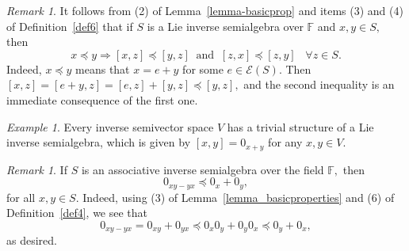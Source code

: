 \documentclass[10pt,a4paper]{amsart}
\theoremstyle{definition}
\theoremstyle{remark}
\newtheorem{rem}[thm]{Remark}
\newtheorem{ex}[thm]{Example}
\numberwithin{equation}{section}
\newtheorem*{Theorem A}{\textbf{Theorem A}}
\newtheorem*{Corollary E}{\textbf{Corollary E}}
\newtheorem*{Corollary F}{\textbf{Corollary F}}
\newtheorem*{Theorem B}{\textbf{Theorem B}}
\newtheorem*{Theorem C}{\textbf{Theorem C}}
\newtheorem*{Theorem D}{\textbf{Theorem B}}
\newtheorem*{p a}{\textbf{Proof of  Theorem A}}
\newtheorem*{p b}{\textbf{Proof of Theorem B}}
\newtheorem*{p c}{\textbf{Proof of  Theorem C}}
\newtheorem*{p d}{\textbf{Proof of  Theorem D}}
\newcommand{\E}{\mathcal{E}}
\newcommand{\0}{{\vartheta}}
\begin{document}
\begin{rem} It  follows from (2) of Lemma~\ref{lemma-basicprop} and items (3) and (4) of  Definition~\ref{def6} that if $S$ is a  Lie inverse semialgebra over  $\mathbb{F}$ and $x,y \in S,$  then 
\begin{equation}\label{eq:ineq}
x \preceq  y \Rightarrow [x,z] \preceq [y,z]\;\;\text{and}\;\;  [z,x] \preceq [z,y]\;\;\; \forall z\in S.
\end{equation} Indeed, $x \preceq y$ means that $x= e+ y$ for some $e\in \E (S).$ Then $[x,z] = [e+y,z] = [e,z]+
[y,z] \preceq [y,z],$ and the second inequality is an
immediate  consequence of the first one.
\end{rem}


\begin{ex}
Every inverse semivector space $V$ has a trivial structure of a Lie inverse semialgebra, which is given by $[x,y]=0_{x+y}$ for any $x,y\in V$. 
\end{ex}


\begin{rem}\label{rem:InvAssocLieInequality} 
    If  $S$ is an  associative inverse semialgebra over the field
      $\mathbb{F},$ then
\begin{equation}\label{eq:InvAssocLieInequality}   
    0_{xy -yx} \preceq 0_x + 0_y,
\end{equation}  for all $x,y \in S.$ Indeed, using  (3) of  Lemma~\ref{lemma_basicproperties} and  (6) of Definition~\ref{def4}, we see that 
$$ 0_{xy - yx} =  0_{xy} + 0_{yx}\preceq 0_{x}0_{y} + 0_{y}0_{x} \preceq 0_y + 0_x,$$ as desired.
\end{rem}
\end{document}
